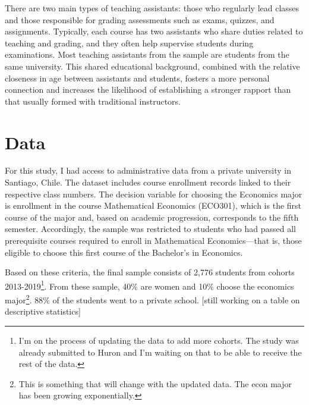 There are two main types of teaching assistants: those who regularly lead classes and those responsible for grading assessments such as exams, quizzes, and assignments. Typically, each course has two assistants who share duties related to teaching and grading, and they often help supervise students during examinations. Most teaching assistants from the sample are students from the same university. This shared educational background, combined with the relative closeness in age between assistants and students, fosters a more personal connection and increases the likelihood of establishing a stronger rapport than that usually formed with traditional instructors.

\section{ Data}

For this study, I had access to administrative data from a private university in Santiago, Chile. The dataset includes course enrollment records linked to their respective class numbers. The decision variable for choosing the Economics major is enrollment in the course Mathematical Economics (ECO301), which is the first course of the major and, based on academic progression, corresponds to the fifth semester. Accordingly, the sample was restricted to students who had passed all prerequisite courses required to enroll in Mathematical Economics—that is, those eligible to choose this first course of the Bachelor’s in Economics. 

Based on these criteria, the final sample consists of 2,776 students from cohorts 2013-2019\footnote{I'm on the process of updating the data to add more cohorts. The study was already submitted to Huron and I'm waiting on that to be able to receive the rest of the data.}. From these sample, 40\% are women and 10\% choose the economics major\footnote{This is something that will change with the updated data. The econ major has been growing exponentially.}. 88\% of the students went to a private school. [still working on a table on descriptive statistics]

